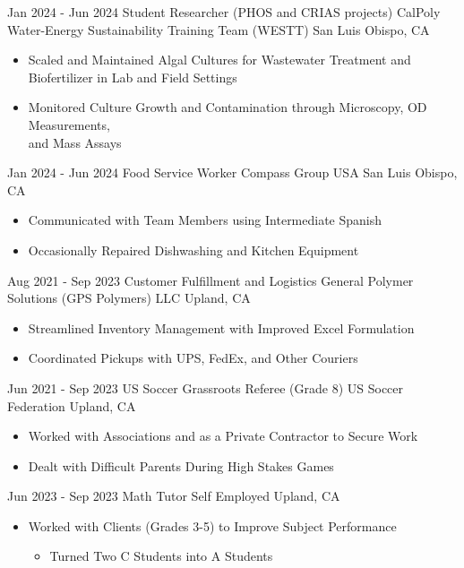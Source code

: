 \documentclass[11pt]{moderncv}
\begin{document}
\cventry
{Jan 2024 - Jun 2024}
{Student Researcher (PHOS and CRIAS projects)}
{CalPoly Water-Energy Sustainability Training Team (WESTT)}
{San Luis Obispo, CA}
{}
{%
\begin{itemize}
\item Scaled and Maintained Algal Cultures for Wastewater Treatment and
      \\ Biofertilizer in Lab and Field Settings
\item Monitored Culture Growth and Contamination through Microscopy, OD Measurements,
      \\ and Mass Assays
\end{itemize}
}
\cventry
{Jan 2024 - Jun 2024}
{Food Service Worker}
{Compass Group USA}
{San Luis Obispo, CA}
{}
{%
\begin{itemize}
\item Communicated with Team Members using Intermediate Spanish
\item Occasionally Repaired Dishwashing and Kitchen Equipment
\end{itemize}
}
\cventry
{Aug 2021 - Sep 2023}
{Customer Fulfillment and Logistics}
{General Polymer Solutions (GPS Polymers) LLC}
{Upland, CA}
{}
{%
\begin{itemize}
\item Streamlined Inventory Management with Improved Excel Formulation
\item Coordinated Pickups with UPS, FedEx, and Other Couriers
\end{itemize}
}
\cventry
{Jun 2021 - Sep 2023}
{US Soccer Grassroots Referee (Grade 8)}
{US Soccer Federation}
{Upland, CA}
{}
{%
\begin{itemize}
\item Worked with Associations and as a Private Contractor to Secure Work
\item Dealt with Difficult Parents During High Stakes Games
\end{itemize}
}
\cventry
{Jun 2023 - Sep 2023}
{Math Tutor}
{Self Employed}
{Upland, CA}
{}
{%
\begin{itemize}
\item Worked with Clients (Grades 3-5) to Improve Subject Performance
  \begin{itemize}
  \item Turned Two C Students into A Students
  \end{itemize}
\end{itemize}
}
\end{document}

